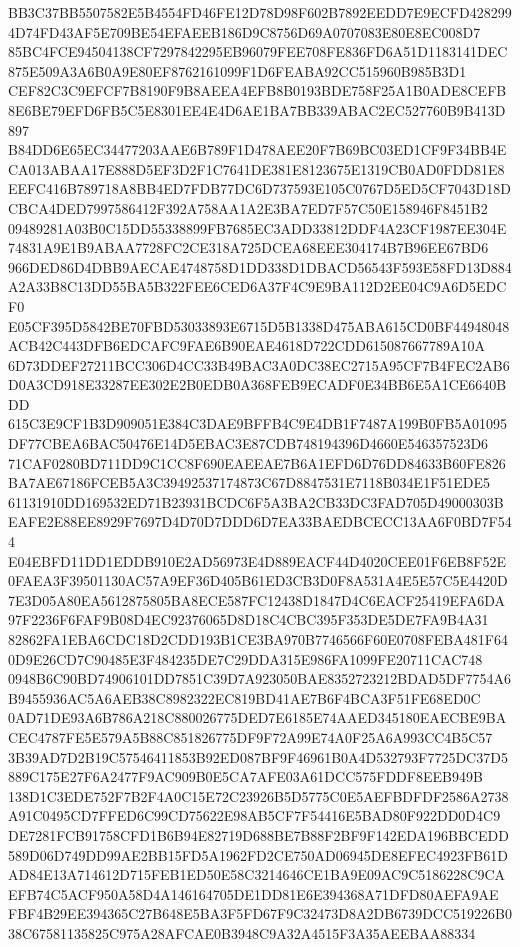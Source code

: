 \documentclass[UTF8,fontset=fandol,zihao=-4,a4paper]{ctexart}
\begin{document}
{{BB3C37BB5507582E5B4554FD46FE12D78D98F602B7892EEDD7E9ECFD4282994D74FD43AF5E709BE54EFAEEB186D9C8756D69A0707083E80E8EC008D7
85BC4FCE94504138CF7297842295EB96079FEE708FE836FD6A51D1183141DEC875E509A3A6B0A9E80EF8762161099F1D6FEABA92CC515960B985B3D1
CEF82C3C9EFCF7B8190F9B8AEEA4EFB8B0193BDE758F25A1B0ADE8CEFB8E6BE79EFD6FB5C5E8301EE4E4D6AE1BA7BB339ABAC2EC527760B9B413D897
B84DD6E65EC34477203AAE6B789F1D478AEE20F7B69BC03ED1CF9F34BB4ECA013ABAA17E888D5EF3D2F1C7641DE381E8123675E1319CB0AD0FDD81E8
EEFC416B789718A8BB4ED7FDB77DC6D737593E105C0767D5ED5CF7043D18DCBCA4DED7997586412F392A758AA1A2E3BA7ED7F57C50E158946F8451B2
09489281A03B0C15DD55338899FB7685EC3ADD33812DDF4A23CF1987EE304E74831A9E1B9ABAA7728FC2CE318A725DCEA68EEE304174B7B96EE67BD6
966DED86D4DBB9AECAE4748758D1DD338D1DBACD56543F593E58FD13D884A2A33B8C13DD55BA5B322FEE6CED6A37F4C9E9BA112D2EE04C9A6D5EDCF0
E05CF395D5842BE70FBD53033893E6715D5B1338D475ABA615CD0BF44948048ACB42C443DFB6EDCAFC9FAE6B90EAE4618D722CDD615087667789A10A
6D73DDEF27211BCC306D4CC33B49BAC3A0DC38EC2715A95CF7B4FEC2AB6D0A3CD918E33287EE302E2B0EDB0A368FEB9ECADF0E34BB6E5A1CE6640BDD
615C3E9CF1B3D909051E384C3DAE9BFFB4C9E4DB1F7487A199B0FB5A01095DF77CBEA6BAC50476E14D5EBAC3E87CDB748194396D4660E546357523D6
71CAF0280BD711DD9C1CC8F690EAEEAE7B6A1EFD6D76DD84633B60FE826BA7AE67186FCEB5A3C39492537174873C67D8847531E7118B034E1F51EDE5
61131910DD169532ED71B23931BCDC6F5A3BA2CB33DC3FAD705D49000303BEAFE2E88EE8929F7697D4D70D7DDD6D7EA33BAEDBCECC13AA6F0BD7F544
E04EBFD11DD1EDDB910E2AD56973E4D889EACF44D4020CEE01F6EB8F52E0FAEA3F39501130AC57A9EF36D405B61ED3CB3D0F8A531A4E5E57C5E4420D
7E3D05A80EA5612875805BA8ECE587FC12438D1847D4C6EACF25419EFA6DA97F2236F6FAF9B08D4EC92376065D8D18C4CBC395F353DE5DE7FA9B4A31
82862FA1EBA6CDC18D2CDD193B1CE3BA970B7746566F60E0708FEBA481F640D9E26CD7C90485E3F484235DE7C29DDA315E986FA1099FE20711CAC748
0948B6C90BD74906101DD7851C39D7A923050BAE8352723212BDAD5DF7754A6B9455936AC5A6AEB38C8982322EC819BD41AE7B6F4BCA3F51FE68ED0C
0AD71DE93A6B786A218C880026775DED7E6185E74AAED345180EAECBE9BACEC4787FE5E579A5B88C851826775DF9F72A99E74A0F25A6A993CC4B5C57
3B39AD7D2B19C57546411853B92ED087BF9F46961B0A4D532793F7725DC37D5889C175E27F6A2477F9AC909B0E5CA7AFE03A61DCC575FDDF8EEB949B
138D1C3EDE752F7B2F4A0C15E72C23926B5D5775C0E5AEFBDFDF2586A2738A91C0495CD7FFED6C99CD75622E98AB5CF7F54416E5BAD80F922DD0D4C9
DE7281FCB91758CFD1B6B94E82719D688BE7B88F2BF9F142EDA196BBCEDD589D06D749DD99AE2BB15FD5A1962FD2CE750AD06945DE8EFEC4923FB61D
AD84E13A714612D715FEB1ED50E58C3214646CE1BA9E09AC9C5186228C9CAEFB74C5ACF950A58D4A146164705DE1DD81E6E394368A71DFD80AEFA9AE
FBF4B29EE394365C27B648E5BA3F5FD67F9C32473D8A2DB6739DCC519226B038C67581135825C975A28AFCAE0B3948C9A32A4515F3A35AEEBAA88334
}}
\end{document}
